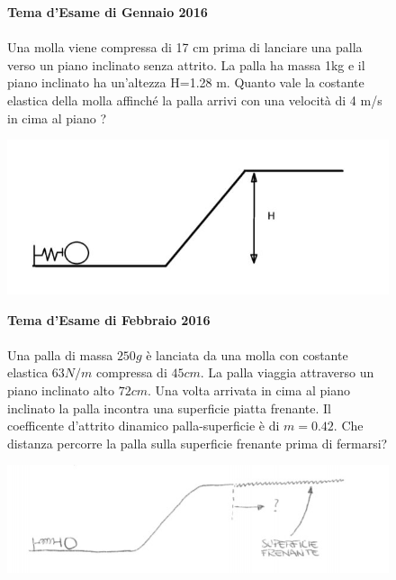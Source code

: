 
\begin{figure}[h!]
    \textbf{Tema d'Esame di Gennaio 2016}\\ \\
    Una molla viene compressa di 17 cm prima di lanciare una palla verso un piano inclinato
    senza attrito. La palla ha massa 1kg e il piano inclinato ha un'altezza H=1.28 m. Quanto vale
    la costante elastica della molla affinché la palla arrivi con una velocità di 4 m/s in cima al
    piano ?
    \\
        \begin{center}
            \includegraphics[scale=0.5]{ES2/GEN022016.jpg}
        \end{center}
    \end{figure}
    
    \begin{figure}[h!]
    \textbf{Tema d'Esame di Febbraio 2016}\\ \\
    Una palla di massa $250g$ è lanciata da una molla con costante elastica $63 N/m$ compressa di $45 cm$. La palla viaggia attraverso un piano inclinato alto $72 cm$. Una volta arrivata in cima al piano inclinato la palla incontra una superficie piatta frenante. Il coefficente d'attrito dinamico palla-superficie è di $m=0.42$. Che distanza percorre la palla sulla superficie frenante prima di fermarsi?
    \\
        \begin{center}
            \includegraphics[scale=0.5]{ES2/FEB022016.jpg}
        \end{center}
    \end{figure}
    
